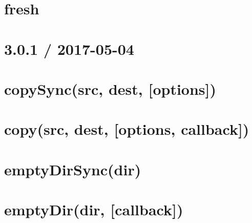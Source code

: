 \documentclass[twoside]{book}
\newcommand{\+}{\discretionary{\mbox{\scriptsize$\hookleftarrow$}}{}{}}
\begin{document}
\chapter{fresh}
\label{md__c_1_workspace_demo_src_main_script_node_modules_fresh__r_e_a_d_m_e}

\chapter{3.0.1 / 2017-\/05-\/04}
\label{md__c_1_workspace_demo_src_main_script_node_modules_fs-extra__c_h_a_n_g_e_l_o_g}

\chapter{copy\+Sync(src, dest, \mbox{[}options\mbox{]})}
\label{md__c_1_workspace_demo_src_main_script_node_modules_fs-extra_docs_copy-sync}

\chapter{copy(src, dest, \mbox{[}options, callback\mbox{]})}
\label{md__c_1_workspace_demo_src_main_script_node_modules_fs-extra_docs_copy}

\chapter{empty\+Dir\+Sync(dir)}
\label{md__c_1_workspace_demo_src_main_script_node_modules_fs-extra_docs_empty_dir-sync}

\chapter{empty\+Dir(dir, \mbox{[}callback\mbox{]})}
\label{md__c_1_workspace_demo_src_main_script_node_modules_fs-extra_docs_empty_dir}

\end{document}
